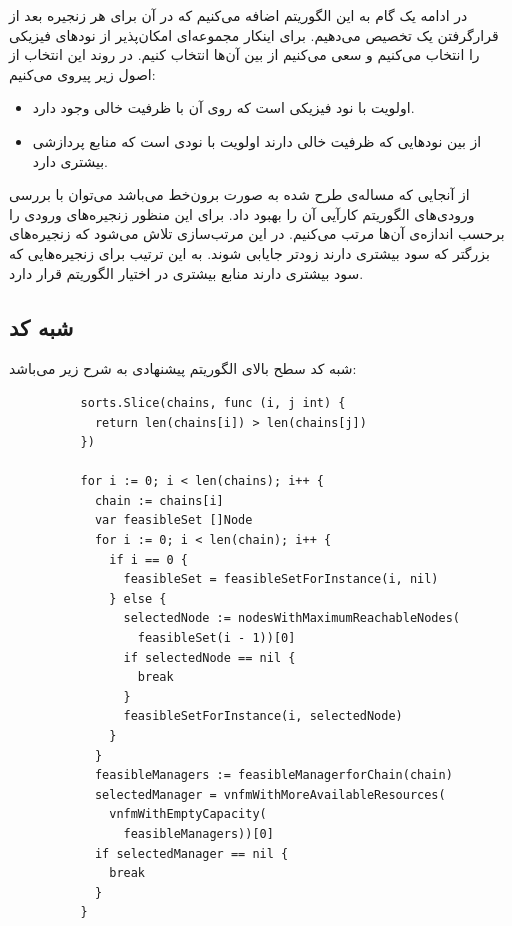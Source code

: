 در ادامه یک گام به این الگوریتم اضافه می‌کنیم که در آن برای هر زنجیره بعد از قرارگرفتن یک
تخصیص می‌دهیم. برای اینکار مجموعه‌ای امکان‌پذیر از نودهای فیزیکی را انتخاب می‌کنیم
و سعی می‌کنیم از بین آن‌ها انتخاب کنیم. در روند این انتخاب از اصول زیر پیروی می‌کنیم:

\begin{itemize}
    \item اولویت با نود فیزیکی است که روی آن  با ظرفیت خالی وجود دارد.
    \item از بین نودهایی که ظرفیت خالی دارند اولویت با نودی است که منابع پردازشی بیشتری دارد.
\end{itemize}

از آنجایی که مساله‌ی طرح شده به صورت برون‌خط می‌باشد می‌توان با بررسی ورودی‌های الگوریتم کارآیی آن را بهبود داد.
برای این منظور زنجیره‌های ورودی را برحسب اندازه‌ی آن‌ها مرتب می‌کنیم.
در این مرتب‌سازی تلاش می‌شود که زنجیره‌های بزرگتر که سود بیشتری دارند زودتر جایابی شوند.
به این ترتیب برای زنجیره‌هایی که سود بیشتری دارند منابع بیشتری در اختیار الگوریتم قرار دارد.

\subsection{شبه کد}

شبه کد سطح بالای الگوریتم پیشنهادی به شرح زیر می‌باشد:

\begin{latin}
    \begin{verbatim}
          sorts.Slice(chains, func (i, j int) {
            return len(chains[i]) > len(chains[j])
          })
          
          for i := 0; i < len(chains); i++ {
            chain := chains[i]
            var feasibleSet []Node
            for i := 0; i < len(chain); i++ {
              if i == 0 {
                feasibleSet = feasibleSetForInstance(i, nil)
              } else {
                selectedNode := nodesWithMaximumReachableNodes(
                  feasibleSet(i - 1))[0]
                if selectedNode == nil {
                  break
                }
                feasibleSetForInstance(i, selectedNode)
              }
            }
            feasibleManagers := feasibleManagerforChain(chain)
            selectedManager = vnfmWithMoreAvailableResources(
              vnfmWithEmptyCapacity(
                feasibleManagers))[0]
            if selectedManager == nil {
              break
            }
          }
    \end{verbatim}
\end{latin}

